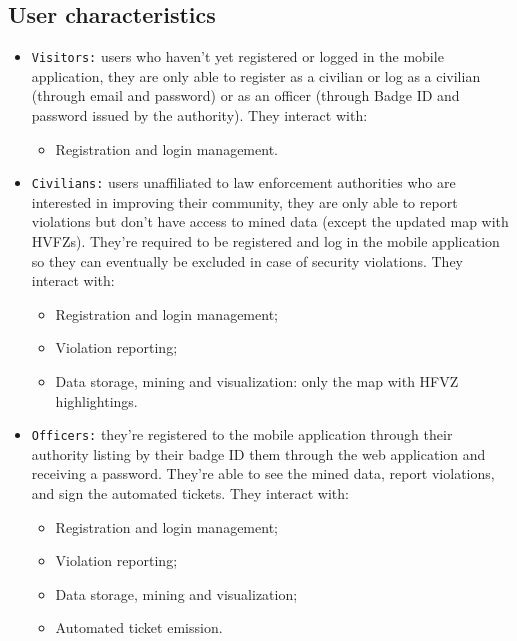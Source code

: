 \documentclass[12pt,a4paper]{article}
\begin{document}
\subsection{User characteristics}
 \begin{itemize}
\item \texttt{Visitors:} users who haven't yet registered or logged in the mobile application, they are only able to register as a civilian or log as a civilian (through email and password) or as an officer (through Badge ID and password issued by the authority). They interact with:
		\begin{itemize}
			\item Registration and login management.
		\end{itemize}

\item \texttt{Civilians:} users unaffiliated to law enforcement authorities who are interested in improving their community, they are only able to report violations but don't have access to mined data (except the updated map with HVFZs). They're required to be registered and log in the mobile application so they can eventually be excluded in case of security violations. They interact with: 
		\begin{itemize}
			\item Registration and login management;
			\item Violation reporting;
			\item Data storage, mining and visualization: only the map with HFVZ highlightings.
		\end{itemize}
 
\item \texttt{Officers:} they're registered to the mobile application through their authority listing by their badge ID them through the web application and receiving a password. They're able to see the mined data, report violations, and sign the automated tickets.  They interact with: 
		\begin{itemize}
			\item Registration and login management;
			\item Violation reporting;
			\item Data storage, mining and visualization;
			\item Automated ticket emission.
		\end{itemize}


\end{itemize}
\end{document}

